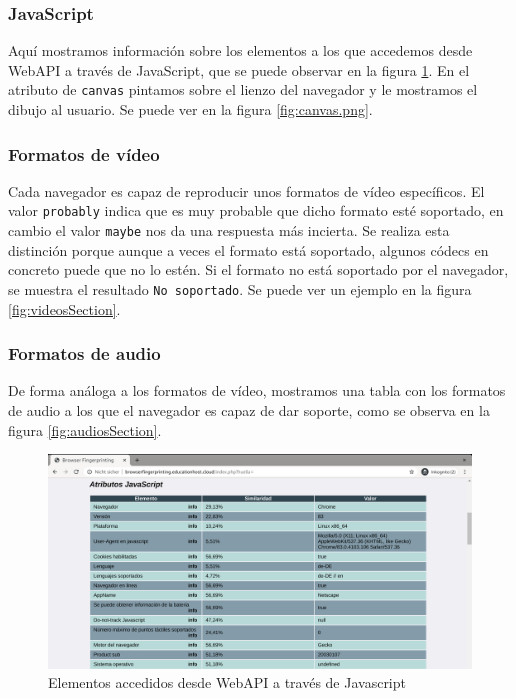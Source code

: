\subsubsection{JavaScript}
Aquí mostramos información sobre los elementos a los que accedemos desde WebAPI a través de JavaScript, que se puede observar en la figura \ref{fig:javaScriptSection.png}. En el atributo de \texttt{canvas} pintamos sobre el lienzo del navegador y le mostramos el dibujo al usuario. Se puede ver en la figura \ref{fig:canvas.png}.

\subsubsection{Formatos de vídeo}
Cada navegador es capaz de reproducir unos formatos de vídeo específicos. El valor \texttt{probably} indica que es muy probable que dicho formato esté soportado, en cambio el valor \texttt{maybe} nos da una respuesta más incierta. Se realiza esta distinción porque aunque a veces el formato está soportado, algunos códecs en concreto puede que no lo estén. Si el formato no está soportado por el navegador, se muestra el resultado \texttt{No soportado}. Se puede ver un ejemplo en la figura \ref{fig:videosSection}.

\subsubsection{Formatos de audio}
De forma análoga a los formatos de vídeo, mostramos una tabla con los formatos de audio a los que el navegador es capaz de dar soporte, como se observa en la figura \ref{fig:audiosSection}.

\begin{figure}[tbp]
	\centering
	\includegraphics[width=1\textwidth]{Images/javaScriptSection.png}
	\caption{Elementos accedidos desde WebAPI a través de Javascript}
	\label{fig:javaScriptSection.png}
\end{figure}

